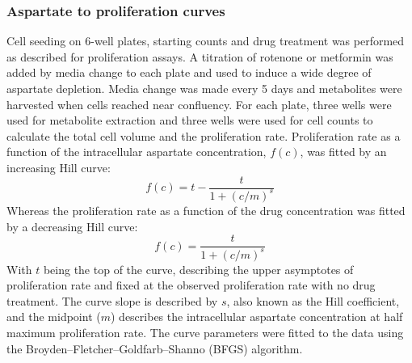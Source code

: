 \subsubsection{Aspartate to proliferation curves}
Cell seeding on 6-well plates, starting counts and drug treatment was performed as described for proliferation assays.
A titration of rotenone or metformin was added by media change to each plate and used to induce a wide degree of aspartate depletion.
Media change was made every 5 days and metabolites were harvested when cells reached near confluency.
For each plate, three wells were used for metabolite extraction and three wells were used for cell counts to calculate the total cell volume and the proliferation rate.
Proliferation rate as a function of the intracellular aspartate concentration, $f(c)$, was fitted by an increasing Hill curve:
$$
f(c) = t - \frac{t}{1 + (c/m)^s}
$$
Whereas the proliferation rate as a function of the drug concentration was fitted by a decreasing Hill curve:
$$
f(c) = \frac{t}{1 + (c/m)^s}
$$
With $t$ being the top of the curve, describing the upper asymptotes of proliferation rate and fixed at the observed proliferation rate with no drug treatment.
The curve slope is described by $s$, also known as the Hill coefficient, and the midpoint ($m$) describes the intracellular aspartate concentration at half maximum proliferation rate.
The curve parameters were fitted to the data using the Broyden–Fletcher–Goldfarb–Shanno (BFGS) algorithm.



